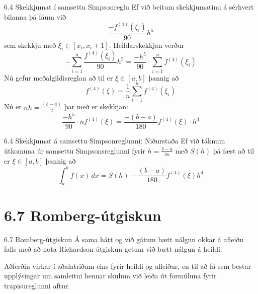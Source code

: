 \begin{frame}{6.4 Skekkjumat í samsettu Simpsonreglu}
Ef við beitum skekkjumatinu á sérhvert bilanna þá fáum við 
\begin{equation*}
  \frac{-f^{(4)}(\xi_i)}{90}h^5
\end{equation*}
sem skekkju með $\xi_i \in [x_i, x_i+1]$. Heildarskekkjan verður
\begin{equation*}
  -\sum_{i=1}^n \frac{f^{(4)}(\xi_i)}{90}h^5 
  = \frac{-h^5}{90}\cdot \sum_{i=1}^n f^{(4)}(\xi_i)
\end{equation*}
\pause
Nú gefur meðalgildisreglan að til er $\xi \in [a,b]$ þannig að
\begin{equation*}
  f^{(4)}(\xi) = \frac{1}{n} \sum_{i=1}^n f^{(4)}(\xi_i)
\end{equation*}
\pause
Nú er $nh = \frac{(b-a)}{2}$ þar með er skekkjan:
\begin{equation*}
  \frac{-h^5}{90}\cdot nf^{(4)}(\xi) 
  = \frac{-(b-a)}{180}f^{(4)}(\xi)\cdot h^4
\end{equation*}
\end{frame}

\begin{frame}{6.4 Skekkjumat á samsettu Simpsonreglunni: Niðurstaða}
\pause
Ef við táknum útkomuna úr samsettu Simpsonsreglunni fyrir 
$h=\frac{b-a}{2n}$ með $S(h)$ þá fæst að til er
$\xi \in [a,b]$ þannig að
\begin{equation*}
  \int_a^b f(x)\,dx = S(h) - \frac{(b-a)}{180}f^{(4)}(\xi)h^4
\end{equation*}
\end{frame}

\section*{6.7 Romberg-útgiskun}
\begin{frame}{6.7 Romberg-útgiskun} 
Á sama hátt og við gátum bætt nálgun okkar á afleiðu falls með að nota
Richardson útgiskun getum við bætt nálgun á heildi. 

\pause
\smallskip
Aðferðin virkar í
aðalatriðum eins fyrir heildi og afleiður, en til að fá sem bestar
upplýsingar um samleitni hennar skulum við leiða út formúluna fyrir
trapisureglunni aftur. 
\end{frame}


